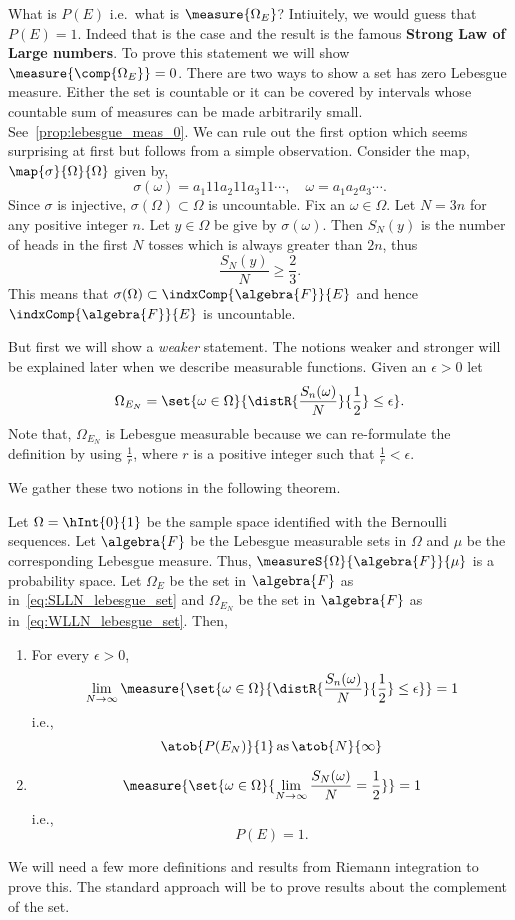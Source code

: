 What is $P(E)$ i.e.~what is $\measure{\Omega_{E}}$? Intiuitely, we would guess that $P(E) = 1$.
Indeed that is the case and the result is the famous \textbf{Strong Law of Large numbers}. To prove
this statement we will show $\measure{\comp{\Omega_{E}}} = 0$. There are two ways to show a set
has zero Lebesgue measure. Either the set is countable or it can be covered by intervals whose
countable sum of measures can be made arbitrarily small. See~\ref{prop:lebesgue_meas_0}. We can rule
out the first option which seems surprising at first but follows from a simple observation. 
Consider the map, $\map{\sigma}{\Omega}{\Omega}$ given by,
\[\sigma(\omega) = a_{1}11a_{2}11a_{3}11\cdots,\quad \omega = a_1a_2a_3\cdots.\]
Since $\sigma$ is injective, $\sigma(\Omega) \subset \Omega$ is uncountable. Fix an $\omega \in
\Omega$. Let $N = 3n$ for any positive integer $n$. Let $y \in \Omega$ be give by $\sigma(\omega)$.
Then $S_N(y)$ is the number of heads in the first $N$ tosses which is always greater than $2n$, thus
\[\frac{S_N(y)}{N} \geq \frac{2}{3}.\]
This means that $\sigma(\Omega) \subset \indxComp{\algebra{F}}{E}$ and hence
$\indxComp{\algebra{F}}{E}$ is uncountable.


But first we will show a \emph{weaker} 
statement. The notions weaker and stronger will be explained later when we describe measurable
functions. Given an $\epsilon > 0$ let 
\begin{equation}\label{eq:WLLN_lebesgue_set}
    \Omega_{E_N} =
\set{\omega\in\Omega}{\distR{\frac{S_n(\omega)}{N}}{\frac{1}{2}} \leq \epsilon}.
\end{equation} 
Note that,
$\Omega_{E_N}$ is Lebesgue measurable because we can re-formulate the definition by using
$\frac{1}{r}$, where $r$ is a positive integer such that $\frac{1}{r} < \epsilon$. 

We gather these two notions in the following theorem.
\begin{Theorem}[name=Law of large numbers for Bernoulli sequences]\label{thm:LLN_bernoulli_seq}
    Let $\Omega = \hInt{0}{1}$ be the sample space identified with the Bernoulli sequences. Let
    $\algebra{F}$ be the Lebesgue measurable sets in $\Omega$ and $\mu$ be the corresponding
    Lebesgue measure. Thus, $\measureS{\Omega}{\algebra{F}}{\mu}$ is a probability space. Let
    $\Omega_{E}$ be the set in $\algebra{F}$ as in~\ref{eq:SLLN_lebesgue_set} and
    $\Omega_{E_N}$ be the set in $\algebra{F}$ as in~\ref{eq:WLLN_lebesgue_set}. Then, 
    \begin{enumerate}
	\item
	    For every $\epsilon > 0$, 
	    \[\lim\limits_{N\to\infty}
		\measure{\set{\omega\in\Omega}{\distR{\frac{S_n(\omega)}{N}}{\frac{1}{2}} \leq \epsilon}} = 1\]
	    i.e.,
	    \[\atob{P({E_N})}{1}\,\text{as}\,\atob{N}{\infty}\]
	\item
	    \[\measure{\set{\omega\in\Omega}{\lim\limits_{N\to\infty}\frac{S_N(\omega)}{N}= \frac{1}{2}}}
	    = 1\]
	    i.e.,
	    \[P({E}) = 1.\]
    \end{enumerate}
\end{Theorem}
We will need a few more definitions and results from Riemann integration to prove this. The standard
approach will be to prove results about the complement of the set.

